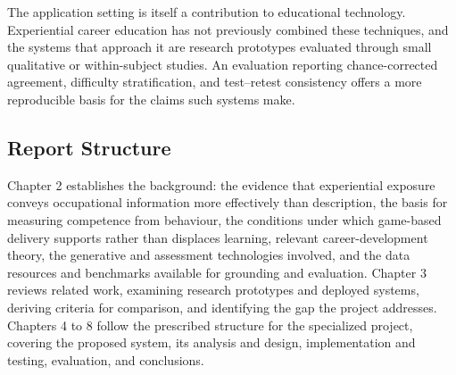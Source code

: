 The application setting is itself a contribution to educational technology. Experiential career education has not previously combined these techniques, and the systems that approach it are research prototypes evaluated through small qualitative or within-\allowbreak{}subject studies. An evaluation reporting chance-\allowbreak{}corrected agreement, difficulty stratification, and test--retest consistency offers a more reproducible basis for the claims such systems make.

\subsection{Report Structure}

Chapter 2 establishes the background: the evidence that experiential exposure conveys occupational information more effectively than description, the basis for measuring competence from behaviour, the conditions under which game-based delivery supports rather than displaces learning, relevant career-\allowbreak{}development theory, the generative and assessment technologies involved, and the data resources and benchmarks available for grounding and evaluation. Chapter 3 reviews related work, examining research prototypes and deployed systems, deriving criteria for comparison, and identifying the gap the project addresses. Chapters 4 to 8 follow the prescribed structure for the specialized project, covering the proposed system, its analysis and design, implementation and testing, evaluation, and conclusions.
